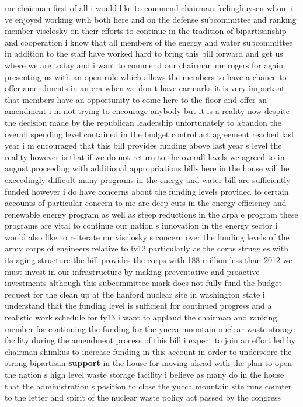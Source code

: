 \documentclass{article}
\begin{document}
\vspace{8mm}
mr chairman first of all i would like to commend chairman frelinghuysen whom i ve enjoyed working with both here and on the defense subcommittee and ranking member visclosky on their efforts to continue in the tradition of bipartisanship and cooperation i know that all members of the energy and water subcommittee in addition to the staff have worked hard to bring this bill forward and get us where we are today and i want to commend our chairman mr rogers for again presenting us with an open rule which allows the members to have a chance to offer amendments in an era when we don t have earmarks it is very important that members have an opportunity to come here to the floor and offer an amendment i m not trying to encourage anybody but it is a reality now despite the decision made by the republican leadership unfortunately to abandon the overall spending level contained in the budget control act agreement reached last year i m encouraged that this bill provides funding above last year s level the reality however is that if we do not return to the overall levels we agreed to in august proceeding with additional appropriations bills here in the house will be exceedingly difficult many programs in the energy and water bill are sufficiently funded however i do have concerns about the funding levels provided to certain accounts of particular concern to me are deep cuts in the energy efficiency and renewable energy program as well as steep reductions in the arpa e program these programs are vital to continue our nation s innovation in the energy sector i would also like to reiterate mr visclosky s concern over the funding levels of the army corps of engineers relative to fy12 particularly as the corps struggles with its aging structure the bill provides the corps with 188 million less than 2012 we must invest in our infrastructure by making preventative and proactive investments although this subcommittee mark does not fully fund the budget request for the clean up at the hanford nuclear site in washington state i understand that the funding level is sufficient for continued progress and a realistic work schedule for fy13 i want to applaud the chairman and ranking member for continuing the funding for the yucca mountain nuclear waste storage facility during the amendment process of this bill i expect to join an effort led by chairman shimkus to increase funding in this account in order to underscore the strong bipartisan {\bf \color{red} support} in the house for moving ahead with the plan to open the nation s high level waste storage facility i believe as many do in the house that the administration s position to close the yucca mountain site runs counter to the letter and spirit of the nuclear waste policy act passed by the congress\pagebreak
\end{document}
